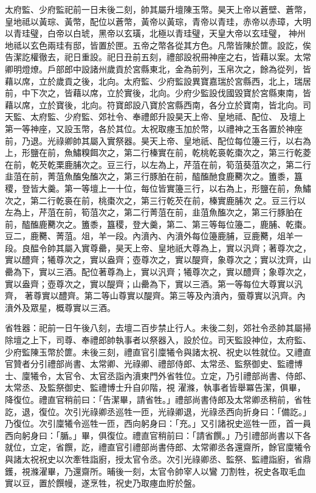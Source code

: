 \begin{pinyinscope}
 太府監、少府監祀前一日未後二刻，帥其屬升壇陳玉幣。昊天上帝以蒼壁、蒼幣，皇地祗以黃琮、黃幣，配位以蒼幣，黃帝以黃琮，青帝以青珪，赤帝以赤璋，大明以青珪璧，白帝以白琥，黑帝以玄璜，北極以青珪璧，天皇大帝以玄珪璧，
 神州地祗以玄色兩珪有邸，皆置於匣。五帝之幣各從其方色。凡幣皆陳於篚。設訖，俟告潔訖權徹去，祀日重設。祀日丑前五刻，禮部設祝冊神座之右，皆藉以案。太常卿明燈燎。戶部郎中設諸州歲貢於宮縣東北，金為前列，玉帛次之，餘為從列，皆藉以席，立於歲貢之後，北向。太府監、少府監設異寶嘉瑞於宮縣西，北上，瑞居前，中下次之，皆藉以席，立於實後，北向。少府少監設伐國毀寶於宮縣東南，皆藉以席，立於寶後，北向。符寶郎設八寶於宮縣西南，各分立於寶南，皆北向。司天監、太府監、少府監、郊社令、奉禮郎升設昊天上帝、皇地祗、配位、
 及壇上第一等神座，又設玉幣，各於其位。太祝取瘞玉加於幣，以禮神之玉各置於神座前，乃退。光祿卿帥其屬入實祭器。昊天上帝、皇地祇、配位每位籩三行，以右為上，形鹽在前，魚鱐糗餌次之，第二行榛實在前，乾桃乾裛乾棗次之，第三行乾菱在前，乾芡乾栗鹿脯次之。豆三行，以左為上，芹菹在前，筍菹葵菹次之，第二行韭菹在前，菁菹魚醢兔醢次之，第三行豚胉在前，醓醢酏食鹿臡次之。簠黍，簋稷，登皆大羹。第一等壇上一十位，每位皆實籩三行，以右為上，形鹽在前，魚鱐次之，第二行乾裛在前，桃棗次之，第三行乾芡在前，榛實鹿脯次
 之。豆三行以左為上，芹菹在前，筍菹次之，第二行菁菹在前，韭菹魚醢次之，第三行豚胉在前，醓醢鹿臡次之。簠黍，簋稷，登大羹，第二、第三等每位籩二，鹿脯、乾棗。豆二，鹿臡、菁菹。俎，羊一段。內濆內、內濆外每位籩鹿脯，豆鹿臡，俎羊一段。良醖令帥其屬入實尊罍，昊天上帝、皇地祇大尊為上，實以汎齊；著尊次之，實以醴齊；犧尊次之，實以盎齊；壺尊次之，實以醍齊，象尊次之；實以沈齊，山罍為下，實以三酒。配位著尊為上，實以汎齊；犧尊次之，實以醴齊；象尊次之，實以盎齊；壺尊次之，實以醍齊；山罍為下，實以三酒。第一等每位大尊實以汎齊，
 著尊實以醴齊。第二等山尊實以醍齊。第三等及內濆內，蜃尊實以汎齊。內濆外及眾星，概尊實以三酒。



 省牲器：祀前一日午後八刻，去壇二百步禁止行人。未後二刻，郊社令丞帥其屬掃除壇之上下，司尊、奉禮郎帥執事者以祭器入，設於位。司天監設神位，太府監、少府監陳玉幣於篚。未後三刻，禮直官引廩犧令與諸太祝、祝史以牲就位。又禮直官贊者分引禮部尚書、太常卿、光祿卿、禮部侍郎、太常丞、監祭御史、監禮博士、廩犧令，太官令、太官丞詣內濆東門外省牲位。立定，乃引禮部尚書、侍郎、太常丞、及監祭御史、監禮博士升自卯階，視
 濯滌，執事者皆舉冪告潔，俱畢，降復位。禮直官稍前曰：「告潔畢，請省牲。」禮部尚書侍郎及太常卿丞稍前，省牲訖，退，復位。次引光祿卿丞巡牲一匝，光祿卿退，光祿丞西向折身曰：「備訖。」乃復位。次引廩犧令巡牲一匝，西向躬身曰：「充。」又引諸祝史巡牲一匝，首一員西向躬身曰：「腯。」畢，俱復位。禮直官稍前曰：「請省饌。」乃引禮部尚書以下各就位，立定，省饌，訖，禮直官引禮部尚書侍郎、太常卿丞各還齋所，餘官廩犧令與諸太祝祝史以次牽牲詣廚，授太官令丞。次引光祿卿丞、監祭、監禮詣廚，省鼎鑊，視滌濯畢，乃還齋所。晡後一刻，太官令帥宰人以鸞
 刀割牲，祝史各取毛血實以豆，置於饌幔，遂烹牲，祝史乃取瘞血貯於盤。




\end{pinyinscope}
